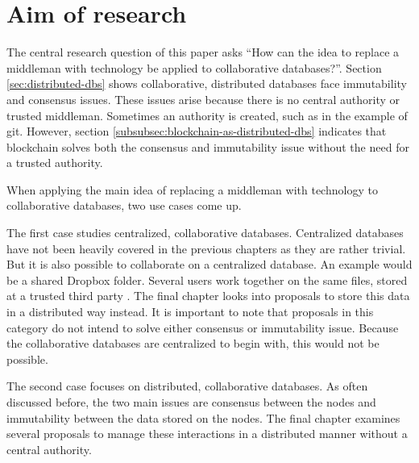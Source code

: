 \chapter{Aim of research}

\iffalse
- start with consensus and consistency in col. distr. dbs => because no central authority
- pivot into main idea: have technology replace an indispensable middleman. As discussed in \ref{subsec:examples-distributed-dbs}, blockchains solve both issues very well. 
- to apply the main idea to collaborative databases: two approaches. First a centralized collaborative database can be stored without a middleman. Second, the interaction between a nodes of a distributed collaborative database can be managed without a middleman
- For the first approach, the final chapter looks into proposals to store data in a distributed manner. Every proposal is examined on advantages, disadvantages, viability and current implementations.
- Concerning the second approach, the last chapter focuses on proposals to manage the interaction 
\fi

The central research question of this paper asks ``How can the idea to replace a middleman with technology be applied to collaborative databases?''. Section \ref{sec:distributed-dbs} shows collaborative, distributed databases face immutability and consensus issues. These issues arise because there is no central authority or trusted middleman. Sometimes an authority is created, such as in the example of git. However, section \ref{subsubsec:blockchain-as-distributed-dbs} indicates that blockchain solves both the consensus and immutability issue without the need for a trusted authority.

When applying the main idea of replacing a middleman with technology to collaborative databases, two use cases come up.

The first case studies centralized, collaborative databases. Centralized databases have not been heavily covered in the previous chapters as they are rather trivial. But it is also possible to collaborate on a centralized database. An example would be a shared Dropbox folder. Several users work together on the same files, stored at a trusted third party \cite{dropbox-sharing}. The final chapter looks into proposals to store this data in a distributed way instead. It is important to note that proposals in this category do not intend to solve either consensus or immutability issue. Because the collaborative databases are centralized to begin with, this would not be possible.

The second case focuses on distributed, collaborative databases. As often discussed before, the two main issues are consensus between the nodes and immutability between the data stored on the nodes. The final chapter examines several proposals to manage these interactions in a distributed manner without a central authority.


